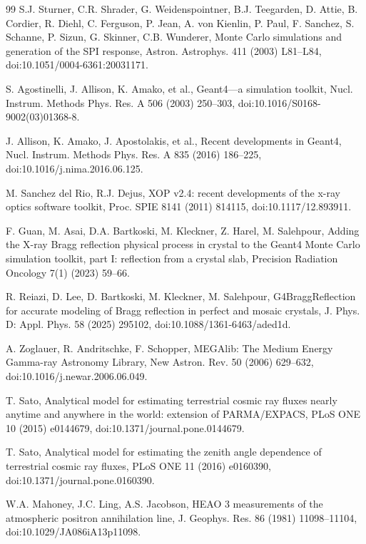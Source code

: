 \documentclass[11pt]{article}
\begin{document}
\begin{thebibliography}{99}
S.J. Sturner, C.R. Shrader, G. Weidenspointner, B.J. Teegarden, D. Attie, B. Cordier, R. Diehl, C. Ferguson, P. Jean, A. von Kienlin, P. Paul, F. Sanchez, S. Schanne, P. Sizun, G. Skinner, C.B. Wunderer, Monte Carlo simulations and generation of the SPI response, Astron. Astrophys. 411 (2003) L81--L84, doi:10.1051/0004-6361:20031171.

S. Agostinelli, J. Allison, K. Amako, et al., Geant4---a simulation toolkit, Nucl. Instrum. Methods Phys. Res. A 506 (2003) 250--303, doi:10.1016/S0168-9002(03)01368-8.

J. Allison, K. Amako, J. Apostolakis, et al., Recent developments in Geant4, Nucl. Instrum. Methods Phys. Res. A 835 (2016) 186--225, doi:10.1016/j.nima.2016.06.125.

M. Sanchez del Rio, R.J. Dejus, XOP v2.4: recent developments of the x-ray optics software toolkit, Proc. SPIE 8141 (2011) 814115, doi:10.1117/12.893911.

F. Guan, M. Asai, D.A. Bartkoski, M. Kleckner, Z. Harel, M. Salehpour, Adding the X-ray Bragg reflection physical process in crystal to the Geant4 Monte Carlo simulation toolkit, part I: reflection from a crystal slab, Precision Radiation Oncology 7(1) (2023) 59--66.

R. Reiazi, D. Lee, D. Bartkoski, M. Kleckner, M. Salehpour, G4BraggReflection for accurate modeling of Bragg reflection in perfect and mosaic crystals, J. Phys. D: Appl. Phys. 58 (2025) 295102, doi:10.1088/1361-6463/aded1d.

A. Zoglauer, R. Andritschke, F. Schopper, MEGAlib: The Medium Energy Gamma-ray Astronomy Library, New Astron. Rev. 50 (2006) 629--632, doi:10.1016/j.newar.2006.06.049.

T. Sato, Analytical model for estimating terrestrial cosmic ray fluxes nearly anytime and anywhere in the world: extension of PARMA/EXPACS, PLoS ONE 10 (2015) e0144679, doi:10.1371/journal.pone.0144679.

T. Sato, Analytical model for estimating the zenith angle dependence of terrestrial cosmic ray fluxes, PLoS ONE 11 (2016) e0160390, doi:10.1371/journal.pone.0160390.

W.A. Mahoney, J.C. Ling, A.S. Jacobson, HEAO 3 measurements of the atmospheric positron annihilation line, J. Geophys. Res. 86 (1981) 11098--11104, doi:10.1029/JA086iA13p11098.


\end{thebibliography}
\end{document}
